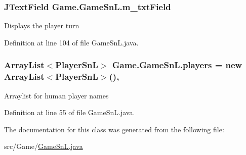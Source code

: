 \subsubsection[{m\+\_\+txt\+Field}]{\setlength{\rightskip}{0pt plus 5cm}J\+Text\+Field Game.\+Game\+Sn\+L.\+m\+\_\+txt\+Field\hspace{0.3cm}{\ttfamily [private]}}\label{class_game_1_1_game_sn_l_a0726c8332d62c46e936a13dc4d3abd1b}
Displays the player turn 

Definition at line 104 of file Game\+Sn\+L.\+java.

\hypertarget{class_game_1_1_game_sn_l_a942dda31e02524f87962efa42b2c2642}{}
\subsubsection[{players}]{\setlength{\rightskip}{0pt plus 5cm}Array\+List$<${\bf Player\+Sn\+L}$>$ Game.\+Game\+Sn\+L.\+players = new Array\+List$<${\bf Player\+Sn\+L}$>$()\hspace{0.3cm}{\ttfamily [static]}, {\ttfamily [private]}}\label{class_game_1_1_game_sn_l_a942dda31e02524f87962efa42b2c2642}
Arraylist for human player names 

Definition at line 55 of file Game\+Sn\+L.\+java.



The documentation for this class was generated from the following file\+:\begin{DoxyCompactItemize}
\item 
src/\+Game/\hyperlink{_game_sn_l_8java}{Game\+Sn\+L.\+java}\end{DoxyCompactItemize}

